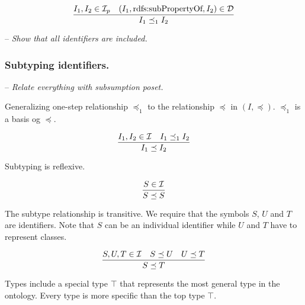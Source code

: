\documentclass[runningheads]{llncs}
\newcommand{\D}{{\cal D}}
\newcommand{\I}{{\cal I}}
\newcommand{\Ip}{{\cal I}_p}
\newcommand{\notes}[1]{\noindent\begin{small}-- \emph{#1}\\\end{small}}
\begin{document}
\begin{equation}
\dfrac{I_1,I_2\in\Ip \quad (I_1,\text{rdfs:subPropertyOf},I_2)\in \D}
      {I_1\preceq_1\/I_2}
\end{equation}

\notes{Show that all identifiers are included.}


\subsubsection{Subtyping identifiers.} 

%

%
%

\noindent
\notes{Relate everything with subsumption poset.}

Generalizing one-step relationship $\preceq_1$ to the relationship
$\preceq$ in $(I,\preceq)$.  $\preceq_1$ is a basis og $\preceq$.

\begin{equation}
\dfrac{I_1,I_2\in\I \quad I_1\preceq_1 I_2}
      {I_1 \preceq I_2}
\end{equation}

\noindent Subtyping is reflexive.

\begin{equation}
\dfrac{S\in \I}
      {S\preceq\/S}
\end{equation}

\noindent The subtype relationship is transitive. We require that the
symbols $S$, $U$ and $T$ are identifiers. Note that $S$ can be an
individual identifier while $U$ and $T$ have to represent
classes.

\begin{equation}
\dfrac{S,U,T\in\I \quad S\preceq\/U \quad U\preceq\/T}
      {S\preceq\/T}   
\end{equation}

\noindent Types include a special type $\top$ that represents the most
general type in the ontology. Every type is more specific than the top
type $\top$.
\end{document}
